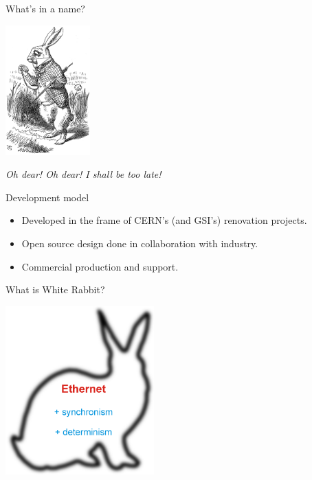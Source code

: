 \documentclass[compress,red]{beamer}
\begin{document}
\begin{frame}{What's in a name?}
\begin{center}
\includegraphics[height=5cm]{misc/Alice-wr.jpg}

\textit{Oh dear! Oh dear! I shall be too late!}\\
\end{center}
\end{frame}

\begin{frame}{Development model}
\begin{itemize}
\item Developed in the frame of CERN's (and GSI's) renovation projects.
\item Open source design done in collaboration with industry.
\item Commercial production and support.
\end{itemize}
\end{frame}

\begin{frame}{What is White Rabbit?}
\begin{center}
\includegraphics[height=6.5cm]{misc/rabbit.pdf}
\end{center}
\end{frame}
\end{document}
